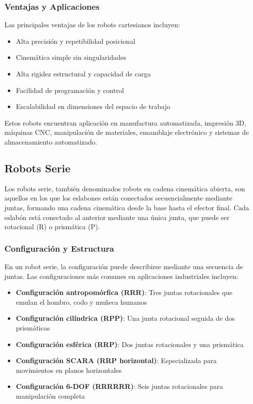 \subsubsection{Ventajas y Aplicaciones}

Las principales ventajas de los robots cartesianos incluyen:

\begin{itemize}
    \item Alta precisión y repetibilidad posicional
    \item Cinemática simple sin singularidades
    \item Alta rigidez estructural y capacidad de carga
    \item Facilidad de programación y control
    \item Escalabilidad en dimensiones del espacio de trabajo
\end{itemize}

Estos robots encuentran aplicación en manufactura automatizada, impresión 3D, máquinas CNC, manipulación de materiales, ensamblaje electrónico y sistemas de almacenamiento automatizado.

\subsection{Robots Serie}

Los robots serie, también denominados robots en cadena cinemática abierta, son aquellos en los que los eslabones están conectados secuencialmente mediante juntas, formando una cadena cinemática desde la base hasta el efector final. Cada eslabón está conectado al anterior mediante una única junta, que puede ser rotacional (R) o prismática (P).

\subsubsection{Configuración y Estructura}

En un robot serie, la configuración puede describirse mediante una secuencia de juntas. Las configuraciones más comunes en aplicaciones industriales incluyen:

\begin{itemize}
    \item \textbf{Configuración antropomórfica (RRR)}: Tres juntas rotacionales que emulan el hombro, codo y muñeca humanos
    \item \textbf{Configuración cilíndrica (RPP)}: Una junta rotacional seguida de dos prismáticas
    \item \textbf{Configuración esférica (RRP)}: Dos juntas rotacionales y una prismática
    \item \textbf{Configuración SCARA (RRP horizontal)}: Especializada para movimientos en planos horizontales
    \item \textbf{Configuración 6-DOF (RRRRRR)}: Seis juntas rotacionales para manipulación completa
\end{itemize}

